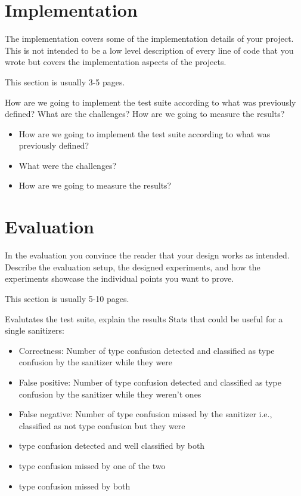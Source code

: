 \documentclass[a4paper,11pt,oneside]{report}
\begin{document}
\chapter{Implementation}

The implementation covers some of the implementation details of your project.
This is not intended to be a low level description of every line of code that
you wrote but covers the implementation aspects of the projects.

This section is usually 3-5 pages.

How are we going to implement the test suite according to what was previously defined? What are the challenges? 
How are we going to measure the results?

\begin{itemize}
       \item How are we going to implement the test suite according to what was previously defined? 
       \item What were the challenges?
       \item How are we going to measure the results?
\end{itemize}


\chapter{Evaluation}

In the evaluation you convince the reader that your design works as intended.
Describe the evaluation setup, the designed experiments, and how the
experiments showcase the individual points you want to prove.

This section is usually 5-10 pages.

Evalutates the test suite, explain the results
Stats that could be useful for a single sanitizers:
\begin{itemize}
       \item Correctness: Number of type confusion detected and classified as type confusion by the sanitizer while they were
       \item False positive: Number of type confusion detected and classified as type confusion by the sanitizer while they weren't ones
       \item False negative: Number of type confusion missed by the sanitizer i.e., classified as not type confusion but they were

       \item type confusion detected and well classified by both
       \item type confusion missed by one of the two
       \item type confusion missed by both
\end{itemize}
\end{document}
